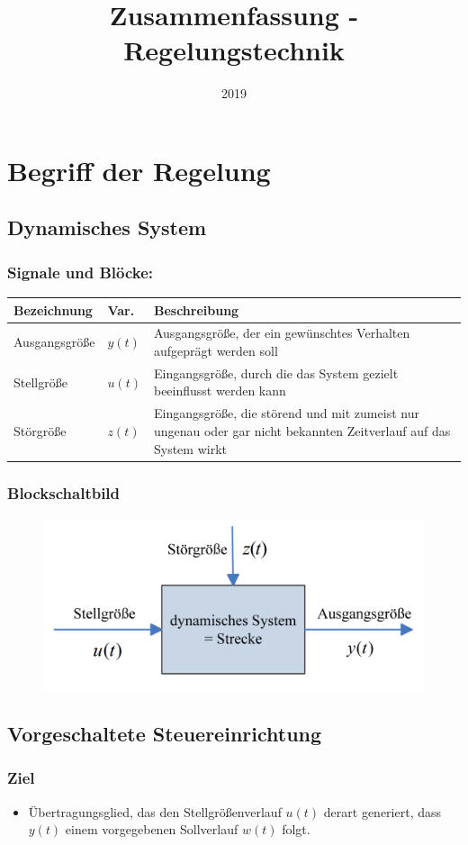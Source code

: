 \documentclass[10pt,a4paper]{article}
\title{Zusammenfassung - Regelungstechnik}
\author{}
\date{2019}
\begin{document}
	\tableofcontents
	\pagebreak
	
\section{Begriff der Regelung}

\subsection{Dynamisches System}
\subsubsection*{Signale und Blöcke:}
\begin{tabularx}{\columnwidth}{llX}
	Bezeichnung & Var. & Beschreibung \\
	\hline
	Ausgangsgröße & $y(t)$ & Ausgangsgröße, der ein gewünschtes Verhalten aufgeprägt werden soll \\
	Stellgröße & $u(t)$ & Eingangsgröße, durch die das System gezielt beeinflusst werden kann \\
	Störgröße & $z(t)$ & Eingangsgröße, die störend und mit zumeist nur ungenau oder gar nicht bekannten Zeitverlauf auf das System wirkt \\
\end{tabularx}

\subsubsection*{Blockschaltbild}
\begin{figure}[H]
	\includegraphics[width=0.5\columnwidth]{imgs/abb1_3.png}
\end{figure}

\subsection{Vorgeschaltete Steuereinrichtung}
\label{steuerung}
\subsubsection*{Ziel}
\begin{itemize}
	\item Übertragungsglied, das den Stellgrößenverlauf $u(t)$ derart generiert, dass $y(t)$ einem vorgegebenen Sollverlauf $w(t)$ folgt.
\end{itemize}
\end{document}
